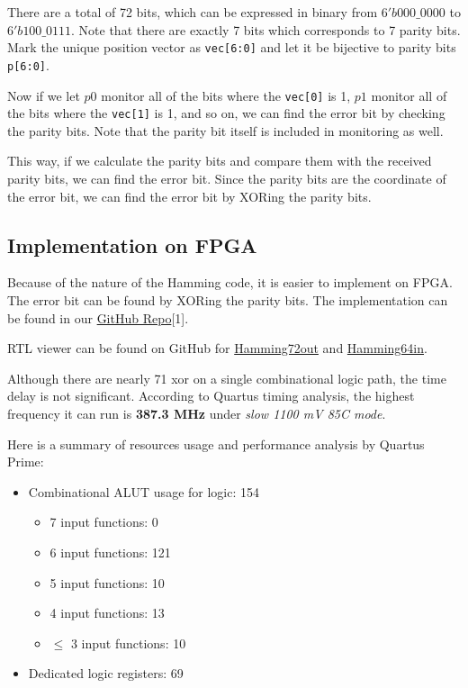 \documentclass[conference]{IEEEtran}
\begin{document}
There are a total of 72 bits, which can be expressed in binary from
$6'b000\_0000$ to $6'b 100\_0111$. Note that there are exactly 7 bits which
corresponds to 7 parity bits. Mark the unique position vector as
\texttt{vec[6:0]} and let it be bijective to parity bits \texttt{p[6:0]}.

Now if we let $p0$ monitor all of the bits where the \texttt{vec[0]} is 1, $p1$
monitor all of the bits where the \texttt{vec[1]} is 1, and so on, we can find
the error bit by checking the parity bits. Note that the parity bit itself is
included in monitoring as well.

This way, if we calculate the parity bits and compare them with the received
parity bits, we can find the error bit. Since the parity bits are the
coordinate of the error bit, we can find the error bit by XORing the parity
bits.

\subsection{Implementation on FPGA}

Because of the nature of the Hamming code, it is easier to implement on FPGA.
The error bit can be found by XORing the parity bits. The implementation can be
found in our \href{https://github.com/luckunately/ELEC433-Projects}{GitHub
  Repo}[1]. %

  RTL viewer can be found on GitHub for \href{https://github.com/luckunately/ELEC433-Projects/blob/add-tex/Hamming72out/Hamming72out_RTL.pdf}{Hamming72out} and \href{https://github.com/luckunately/ELEC433-Projects/blob/add-tex/Hamming64in/Hamming64inRTL.pdf}{Hamming64in}.

Although there are nearly 71 xor on a single combinational logic path, the time
delay is not significant. According to Quartus timing analysis, the highest
frequency it can run is \textbf{387.3 MHz} under \textit{slow 1100 mV 85C
  mode}.

Here is a summary of resources usage and performance analysis by Quartus Prime:
\begin{itemize}
  \item Combinational ALUT usage for logic: 154
  \begin{itemize}
    \item 7 input functions: 0
    \item 6 input functions: 121
    \item 5 input functions: 10
    \item 4 input functions: 13
    \item $\leq$ 3 input functions: 10
  \end{itemize}
  \item Dedicated logic registers: 69
\end{itemize}
\end{document}
